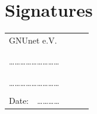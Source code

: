 \documentclass[10pt, a4paper, bibliography=totocnumbered]{article}
\begin{document}
\section*{Signatures}
\begin{tabularx}{\textwidth}{ XXXX }
GNUnet e.V. & & & \\
& & &\\
& & &\\
\dots{}\dots{}\dots{}\dots{}\dots{}\dots{}\dots{}\dots{}\dots{}&&&
\\
& & &\\
& & &\\
\dots{}\dots{}\dots{}\dots{}\dots{}\dots{}\dots{}\dots{}\dots{}&&&
\\
& & &\\
Date:~~\dots{}\dots{}\dots{}\dots{} & & &\\
\end{tabularx}
%
%
\end{document}
